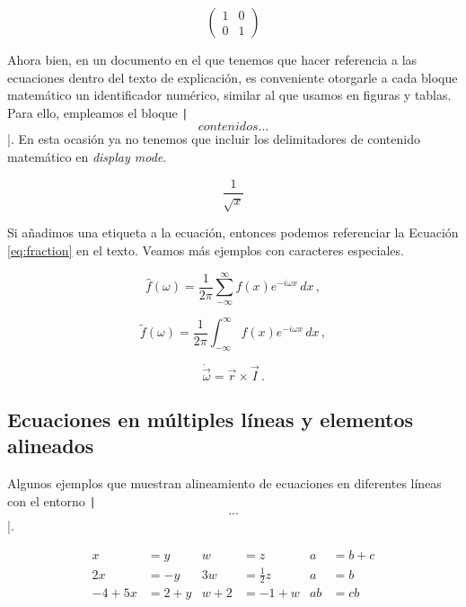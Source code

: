 \[\left(
\begin{matrix}
	1 & 0\\
	0 & 1
\end{matrix}
\right)\]

Ahora bien, en un documento en el que tenemos que hacer referencia a las ecuaciones dentro del
texto de explicación, es conveniente otorgarle a cada bloque matemático un identificador numérico, similar
al que usamos en figuras y tablas. Para ello, empleamos el bloque \texttt|\begin{equation} contenidos... \end{equation}|.
En esta ocasión ya no tenemos que incluir los delimitadores de contenido matemático en \textit{display mode}.

\begin{equation}
	\label{eq:fraction}
	\frac{1}{\sqrt{x}}
\end{equation}

Si añadimos una etiqueta a la ecuación, entonces podemos referenciar la Ecuación \ref{eq:fraction} en el texto.
Veamos más ejemplos con caracteres especiales.


\begin{equation}
	\hat f(\omega)=\frac{1}{2\pi}
	\sum_{-\infty}^\infty f(x)e^{-i\omega x}\,dx\,, 
\end{equation}

\begin{equation}
	\tilde f(\omega)=\frac{1}{2\pi}
	\int_{-\infty}^\infty f(x)e^{-i\omega x}\,dx\,, 
\end{equation}

\begin{equation}
	\dot{\vec \omega}=\vec r\times\vec I\,.
\end{equation}


\subsection{Ecuaciones en múltiples líneas y elementos alineados}

Algunos ejemplos que muestran alineamiento de ecuaciones en diferentes líneas con 
el entorno \texttt|\begin{align*} ... \end{align*}|.

\begin{center}
	\begin{align*}
		x&=y           &  w &=z              &  a&=b+c\\
		2x&=-y         &  3w&=\frac{1}{2}z   &  a&=b\\
		-4 + 5x&=2+y   &  w+2&=-1+w          &  ab&=cb
	\end{align*}
\end{center}

